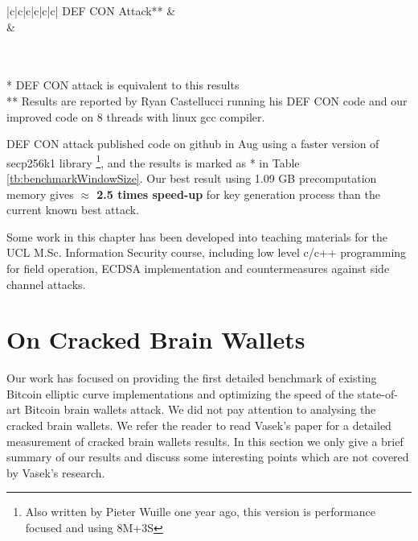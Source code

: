 \begin{table}[h!]
\begin{tabular}{|c|c|c|c|c|c|}
		DEF CON Attack**      &                                   \\ \hline
		&                                   \\ \hline
	\end{tabular}
	\\ \mbox{} \\ * DEF CON attack \cite{RyanDefcon} is equivalent to this results 
	\\ ** Results are reported by Ryan Castellucci running his DEF CON code and our improved code on 8 threads with linux gcc compiler.
\end{table}

DEF CON attack \cite{RyanDefcon} published code on github in Aug using a faster version of secp256k1 library \footnote{Also written by Pieter Wuille one year ago, this version is performance focused and using 8M+3S}, and the results is marked as * in Table \ref{tb:benchmarkWindowSize}.  Our best result using 1.09 GB precomputation memory gives  \textbf{$\approx$ 2.5 times speed-up} for key generation process than the current known best attack.

Some work in this chapter has been developed into teaching materials for the UCL M.Sc. Information Security course, including low level c/c++ programming for field operation, ECDSA implementation and countermeasures against side channel attacks. 
\section{On Cracked Brain Wallets}
Our work has focused on providing the first detailed benchmark of existing Bitcoin elliptic curve implementations and optimizing the speed of the state-of-art Bitcoin brain wallets attack. We did not pay attention to analysing the cracked brain wallets. We refer the reader to read Vasek's paper \cite{vasek2016bitcoin} for a detailed measurement of cracked brain wallets results. In this section we only give a brief summary of our results and discuss some interesting points which are not covered by Vasek's research.

